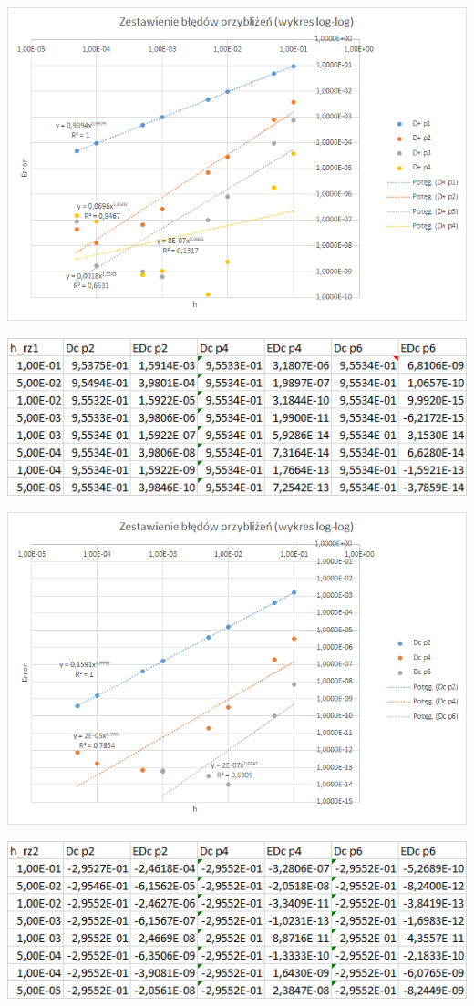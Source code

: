 \includegraphics{Lab2/charts/rz2_log_Df.png}
\newpage


\includegraphics{Lab2/charts/rz1_log_Dc_dane.png}

\includegraphics{Lab2/charts/rz1_log_Dc.png}
\newpage


\includegraphics{Lab2/charts/rz2_log_Dc_dane.png}

